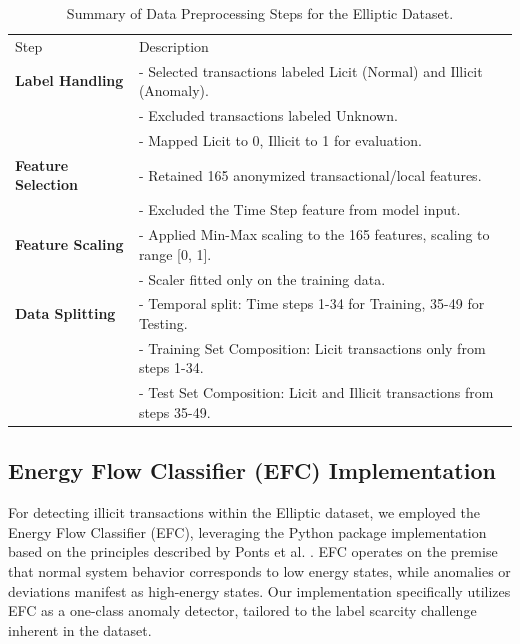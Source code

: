 \documentclass[12pt]{article}
\begin{document}
\begin{table}[htbp]
  \centering
  \caption{Summary of Data Preprocessing Steps for the Elliptic Dataset.}
  \label{tab:preprocessing_summary}
  \begin{tabular}{ll}
    \hline
    Step                  & Description \\
    \textbf{Label Handling} & - Selected transactions labeled Licit (Normal) and Illicit (Anomaly). \\
                          & - Excluded transactions labeled Unknown. \\
                          & - Mapped Licit to 0, Illicit to 1 for evaluation. \\
    \textbf{Feature Selection} & - Retained 165 anonymized transactional/local features. \\
                             & - Excluded the Time Step feature from model input. \\
    \textbf{Feature Scaling}  & - Applied Min-Max scaling to the 165 features, scaling to range [0, 1]. \\
                             & - Scaler fitted only on the training data. \\
    \textbf{Data Splitting}   & - Temporal split: Time steps 1-34 for Training, 35-49 for Testing. \\
                             & - Training Set Composition: Licit transactions only from steps 1-34. \\
                             & - Test Set Composition: Licit and Illicit transactions from steps 35-49. \\
  \end{tabular}
\end{table}

\subsection{Energy Flow Classifier (EFC) Implementation} \label{subsec:efc_implementation}

For detecting illicit transactions within the Elliptic dataset, we employed the Energy Flow Classifier (EFC), leveraging
the Python package implementation \cite{efc_package_github} based on the principles described by Ponts et al.
\cite{pontes2019, souza2022novelopensetenergybased}. EFC operates on the premise that normal system behavior corresponds
to low energy states, while anomalies or deviations manifest as high-energy states. Our implementation specifically
utilizes EFC as a one-class anomaly detector, tailored to the label scarcity challenge inherent in the dataset.
\end{document}

